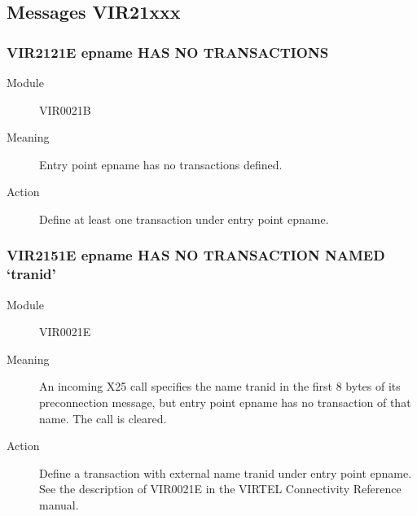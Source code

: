 \documentclass[letterpaper,10pt,english]{sphinxmanual}
\begin{document}
\subsection{Messages VIR21xxx}
\label{\detokenize{messages:messages-vir21xxx}}

\subsubsection{VIR2121E epname HAS NO TRANSACTIONS}
\label{\detokenize{messages:vir2121e-epname-has-no-transactions}}\begin{description}
\item[{Module}] \leavevmode
VIR0021B

\item[{Meaning}] \leavevmode
Entry point epname has no transactions defined.

\item[{Action}] \leavevmode
Define at least one transaction under entry point epname.

\end{description}


\subsubsection{VIR2151E epname HAS NO TRANSACTION NAMED ‘tranid’}
\label{\detokenize{messages:vir2151e-epname-has-no-transaction-named-tranid}}\begin{description}
\item[{Module}] \leavevmode
VIR0021E

\item[{Meaning}] \leavevmode
An incoming X25 call specifies the name tranid in the first 8 bytes of its preconnection message, but entry point epname has no transaction of that name. The call is cleared.

\item[{Action}] \leavevmode
Define a transaction with external name tranid under entry point epname. See the description of VIR0021E in the VIRTEL Connectivity Reference manual.

\end{description}
\end{document}
